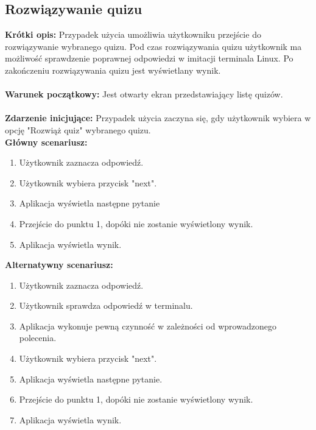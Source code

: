 \documentclass[10pt,a4paper]{report}
\begin{document}
\begin{adjustwidth}{2cm}{2cm}
\subsection{Rozwiązywanie quizu}
\begin{minipage}{1\linewidth}
\textbf{Krótki opis:} Przypadek użycia umożliwia użytkowniku przejście do rozwiązywanie wybranego quizu. Pod czas rozwiązywania quizu użytkownik ma możliwość sprawdzenie poprawnej odpowiedzi w imitacji terminala Linux. Po zakończeniu rozwiązywania quizu jest wyświetlany wynik. \\ \\
\textbf{Warunek początkowy:} Jest otwarty ekran przedstawiający listę quizów.\\ \\
\textbf{Zdarzenie inicjujące:} Przypadek użycia zaczyna się, gdy użytkownik wybiera w opcję "Rozwiąż quiz" wybranego quizu. \\
\textbf{Główny scenariusz:} 
\begin{enumerate}
\setlength\itemsep{0.2cm}
    \item Użytkownik zaznacza odpowiedź.
    \item Użytkownik wybiera przycisk "next".
    \item Aplikacja wyświetla następne pytanie
    \item Przejście do punktu 1, dopóki nie zostanie wyświetlony wynik.
    \item Aplikacja wyświetla wynik.
\end{enumerate}
\end{minipage}
\begin{minipage}{1\linewidth}
\textbf{Alternatywny scenariusz:} 
\begin{enumerate}
\setlength\itemsep{0.2cm}
    \item Użytkownik zaznacza odpowiedź.
    \item Użytkownik sprawdza odpowiedź w terminalu.
    \item Aplikacja wykonuje pewną czynność w zależności od wprowadzonego polecenia.
    \item Użytkownik wybiera przycisk "next".
    \item Aplikacja wyświetla następne pytanie.
    \item Przejście do punktu 1, dopóki nie zostanie wyświetlony wynik.
    \item Aplikacja wyświetla wynik.
\end{enumerate}
\end{minipage}

\end{adjustwidth}
\end{document}
